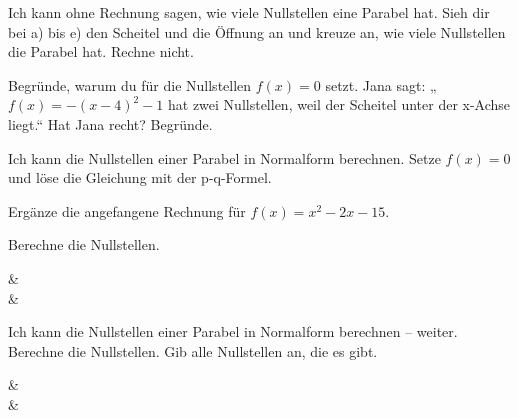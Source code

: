 \begin{aufgabe}{Ich kann ohne Rechnung sagen, wie viele Nullstellen eine Parabel hat. Sieh dir bei a) bis e) den Scheitel und die Öffnung an und kreuze an, wie viele Nullstellen die Parabel hat. Rechne nicht.}
\begin{geruest}
\end{geruest}
\begin{teile}
\teil Begründe, warum du für die Nullstellen $f(x) = 0$ setzt.
\teil Jana sagt: „$f(x) = -(x - 4)^2 - 1$ hat zwei Nullstellen, weil der Scheitel unter der x-Achse liegt.“ Hat Jana recht? Begründe.
\end{teile}
\end{aufgabe}

\begin{aufgabe}{Ich kann die Nullstellen einer Parabel in Normalform berechnen. Setze $f(x) = 0$ und löse die Gleichung mit der p-q-Formel.}
\begin{teile}
\teil Ergänze die angefangene Rechnung für $f(x) = x^2 - 2x - 15$.
\end{teile}
\medskip
Berechne die Nullstellen.
\begin{gleichungsraster}[4]
 &  \\[7mm]
 & \\
\end{gleichungsraster}
\end{aufgabe}

\begin{aufgabe}{Ich kann die Nullstellen einer Parabel in Normalform berechnen – weiter. Berechne die Nullstellen. Gib alle Nullstellen an, die es gibt.}
\begin{gleichungsraster}[4]
 &  \\[7mm]
 &  \\
\end{gleichungsraster}
\end{aufgabe}


